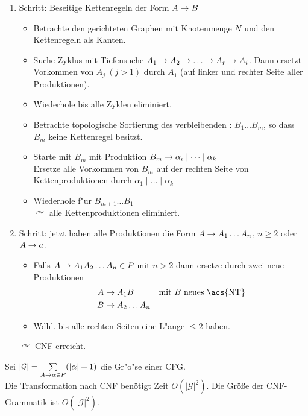 \begin{enumerate}
\item Schritt: Beseitige Kettenregeln der Form $A\-> B$
	\begin{itemize}
		\item Betrachte den gerichteten Graphen mit Knotenmenge $N$ und den Kettenregeln als Kanten.
		\item Suche Zyklus mit Tiefensuche $A_1\->A_2\->\dots\->A_r\->A_i$. Dann ersetzt Vorkommen von $A_j\ (j>1)$ durch $A_1$ (auf linker und rechter Seite aller Produktionen).
		\item Wiederhole bis alle Zyklen eliminiert.
		\item Betrachte topologische Sortierung des verbleibenden : $B_1\dots B_m$, so dass $B_m$ keine Kettenregel besitzt.
		\item Starte mit $B_m$ mit Produktion $B_m\->\alpha_i \mid \dots \mid \alpha_k$\\
			Ersetze alle Vorkommen von $B_m$ auf der rechten Seite von Kettenproduktionen durch $\alpha_1 \mid \dots \mid \alpha_k$
		\item Wiederhole f"ur $B_{m+1}\dots B_1$\\
			$\curvearrowright$ alle Kettenproduktionen eliminiert.
	\end{itemize}
\item Schritt: jetzt haben alle Produktionen die Form $A\-> A_1\dots A_n$, $n\geq 2$ oder $A\-> a$.
	\begin{itemize}
		\item Falls $A\-> A_1 A_2\dots A_n \in P$ mit $n>2$ dann ersetze durch zwei neue Produktionen
		\begin{align*}
			A &\-> A_1 B & \text{mit $B$ neues \acs{NT}}\\
			B &\-> A_2\dots A_n 
		\end{align*}
		\item Wdhl. bis alle rechten Seiten eine L"ange $\le2$ haben.
	\end{itemize}
	$\curvearrowright$ \ac{CNF} erreicht.
\end{enumerate}
\begin{Bemerkung} Sei $|\mathcal{G}|=\sum\limits_{A\->\alpha\in P}(|\alpha|+1)$ die Gr"o"se einer CFG.\\
Die Transformation nach \ac{CNF} benötigt Zeit $O(|\mathcal{G}|^2)$. Die Größe der \ac{CNF}-Grammatik ist $O(|\mathcal{G}|^2)$.
\end{Bemerkung}

